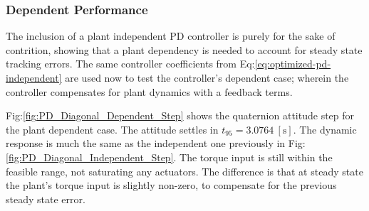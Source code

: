 \subsubsection{Dependent Performance}
\label{subsubsec:simulation.atttiude.pd.dependent}
The inclusion of a plant independent PD controller is purely for the sake of contrition, showing that a plant dependency is needed to account for steady state tracking errors. The same controller coefficients from Eq:\ref{eq:optimized-pd-independent} are used now to test the controller's dependent case; wherein the controller compensates for plant dynamics with a feedback terms.
\par
Fig:\ref{fig:PD_Diagonal_Dependent_Step} shows the quaternion attitude step for the plant dependent case. The attitude settles in $t_{95}=3.0764~[\text{s}]$. The dynamic response is much the same as the independent one previously in Fig:\ref{fig:PD_Diagonal_Independent_Step}. The torque input is still within the feasible range, not saturating any actuators. The difference is that at steady state the plant's torque input is slightly non-zero, to compensate for the previous steady state error.
\par
